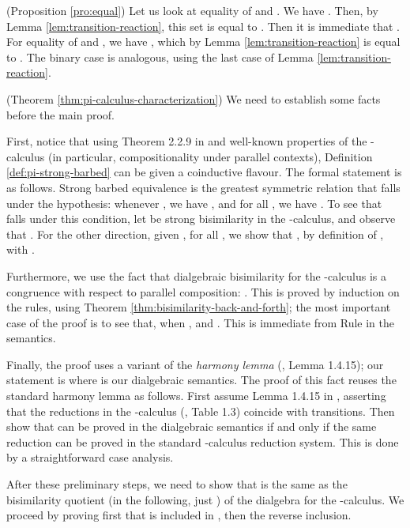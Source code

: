 \documentclass[orivec]{llncs}
\newcommand{\proend}{\medskip}
\renewenvironment{proof}{\begin{pro}}{\proend\end{pro}}
\begin{document}
\begin{proof}(Proposition \ref{pro:equal})
	Let us look at equality of  and .  We have . Then, by Lemma \ref{lem:transition-reaction}, this set is equal to . Then it is immediate that .
	For equality of  and , we have , which by Lemma \ref{lem:transition-reaction} is equal to . The binary case is analogous, using the last case of Lemma \ref{lem:transition-reaction}.
\end{proof}



\begin{proof}(Theorem \ref{thm:pi-calculus-characterization})
We need to establish some facts before the main proof. 

\medskip
First, notice that using Theorem 2.2.9 in \cite{San01} and well-known properties of the -calculus (in particular, compositionality under parallel contexts), Definition \ref{def:pi-strong-barbed} can be given a coinductive flavour. The formal statement is as follows. Strong barbed equivalence is the greatest symmetric relation  that falls under the hypothesis:
whenever , we have , and for all , we have .
 To see that  falls under this condition, let  be strong bisimilarity in the -calculus, and observe that  . For the other direction, given , for all , we show that , by definition of , with .

 \medskip 
 \noindent 
 Furthermore, we use the fact that dialgebraic bisimilarity for the -calculus is a congruence with respect to parallel composition: . This is proved by induction on the rules, using Theorem \ref{thm:bisimilarity-back-and-forth}; the most important case of the proof is to see that, when ,  and . This is immediate from Rule  in the semantics.


\medskip 
 \noindent Finally, the proof uses 
a variant of the \emph{harmony lemma} 
(\cite{San01}, Lemma 1.4.15); our statement is  where  is our dialgebraic semantics. The proof of this fact reuses the standard harmony lemma as follows. First assume Lemma 1.4.15 in \cite{San01}, asserting that the reductions in the -calculus (\cite{San01}, Table 1.3) coincide with  transitions. Then show that  can be proved in the dialgebraic semantics if and only if the same reduction can be proved in the standard -calculus reduction system. This is done by a straightforward case analysis.


 
 \medskip 

 \noindent After these preliminary steps, we need to show that  is the same as the bisimilarity quotient  (in the following, just ) of the dialgebra  for the -calculus. We proceed by proving first that  is included in , then the reverse inclusion.



\end{proof}
\end{document}
